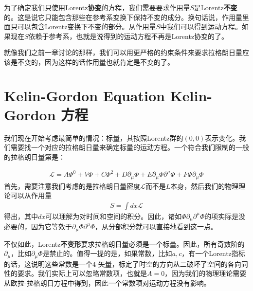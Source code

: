 为了确定我们只使用Lorentz{\bf 协变}的方程，我们需要要求作用量$S$是Lorentz{\bf 不变}的。这是说它只能包含那些在参考系变换下保持不变的成分。换句话说，作用量里面只可以包含Lorentz变换下不变的部分。从作用量$S$中我们可以得到运动方程。如果现在$S$依赖于参考系，也就是说得到的运动方程不再是Lorentz协变的了。

就像我们之前一章讨论的那样，我们可以用更严格的约束条件来要求拉格朗日量应该是不变的，因为这样的话作用量也就肯定是不变的了。

\section[Kelin-Gordon 方程]{Kelin-Gordon Equation Kelin-Gordon 方程}

我们现在开始考虑最简单的情况：标量，其按照Lorentz群的$(0,0)$表示变化。我们需要找一个对应的拉格朗日量来确定标量的运动方程。一个符合我们限制的一般的拉格朗日量第是：

\begin{align}
\mathcal{L} = A\Phi^0+V\Phi+C\Phi^2+D\partial_\mu\Phi+E\partial_\mu\Phi\partial^\mu\Phi+F\Phi\partial_\mu\Phi
\end{align}
首先，需要注意我们考虑的是拉格朗日量密度$\mathcal{L}$而不是$L$本身，然后我们的物理理论可以从作用量
\begin{align}
S = \int dx\mathcal{L}
\end{align}
得出，其中$dx$可以理解为对时间和空间的积分。因此，诸如$\Phi\partial_\mu\partial^\mu\Phi$的项实际是没必要的，因为它等效于$\partial_\mu\Phi\partial^\mu\Phi$，从分部积分就可以直接地看到这一点。

不仅如此，Lorentz{\bf 不变形}要求拉格朗日量必须是一个标量。因此，所有奇数阶的$\partial_\mu$，比如$\partial_\mu\Phi$是禁止的。值得一提的是，如果常数，比如$a, c$，有一个Lorentz指标的话，这说明这些常数是一个$4$-矢量，标定了时空的方向从二破坏了空间的各向同性的要求。我们实际上可以忽略常数项，也就是$A=0$，因为我们的物理理论需要从欧拉-拉格朗日方程中得到，因此一个常数项对运动方程没有影响。










